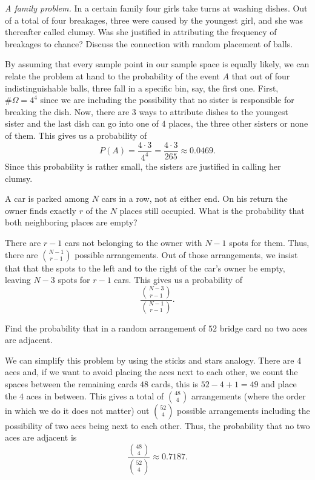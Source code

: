 \begin{problem}[Handout 2, \# 14]
  \emph{A family problem.} In a certain family four girls take turns at
  washing dishes. Out of a total of four breakages, three were caused by
  the youngest girl, and she was thereafter called clumsy. Was she
  justified in attributing the frequency of breakages to chance? Discuss
  the connection with random placement of balls.
\end{problem}
\begin{solution}
  By assuming that every sample point in our sample space is equally
  likely, we can relate the problem at hand to the probability of the event
  \(A\) that out of four indistinguishable balls, three fall in a specific
  bin, say, the first one. First, \(\#\Omega=4^4\) since we are including
  the possibility that no sister is responsible for breaking the dish. Now,
  there are \(3\) ways to attribute dishes to the youngest sister and the
  last dish can go into one of \(4\) places, the three other sisters or
  none of them. This gives us a probability of
  \[
    P(A)=\frac{4\cdot 3}{4^4}=\frac{4\cdot 3}{265}\approx 0.0469.
  \]
  Since this probability is rather small, the sisters are justified in
  calling her clumsy.
\end{solution}
\newpage

\begin{problem}[Handout 2, \# 15]
  A car is parked among \(N\) cars in a row, not at either end. On his
  return the owner finds exactly \(r\) of the \(N\) places still
  occupied. What is the probability that both neighboring places are empty?
\end{problem}
\begin{solution}
  There are \(r-1\) cars not belonging to the owner with \(N-1\) spots for
  them. Thus, there are \(\displaystyle \binom{N-1}{r-1}\) possible
  arrangements. Out of those arrangements, we insist that that the spots to
  the left and to the right of the car's owner be empty, leaving \(N-3\)
  spots for \(r-1\) cars. This gives us a probability of
  \[
    \frac{\displaystyle\binom{N-3}{r-1}}{\displaystyle\binom{N-1}{r-1}}.
  \]
\end{solution}
\newpage

\begin{problem}[Handout 2, \# 16]
  Find the probability that in a random arrangement of \(52\) bridge card
  no two aces are adjacent.
\end{problem}
\begin{solution}
  We can simplify this problem by using the sticks and stars analogy. There
  are \(4\) aces and, if we want to avoid placing the aces next to each
  other, we count the spaces between the remaining cards \(48\) cards, this
  is \(52-4+1=49\) and place the \(4\) aces in between. This gives a total
  of \(\displaystyle\binom{48}{4}\) arrangements (where the order in which
  we do it does not matter) out \(\displaystyle\binom{52}{4}\) possible
  arrangements including the possibility of two aces being next to each
  other. Thus, the probability that no two aces are adjacent is
  \[
    \frac{\displaystyle \binom{48}{4}}{\displaystyle \binom{52}{4}}\approx 0.7187.
  \]
\end{solution}
\newpage

